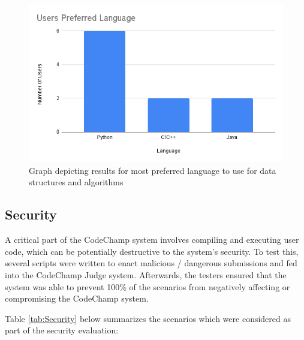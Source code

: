 \documentclass[12pt, titlepage]{article}
\begin{document}
\begin{itemize}
    \begin{figure}[H]
    \centering
    \includegraphics[width=1\textwidth]{question4chart.png}
    
    \caption{Graph depicting results for most preferred language to use for data structures and algorithms}
    
    \label{FigUH-4}
    \end{figure}
    
\end{itemize}

\subsection{Security}\label{sec:security}
A critical part of the CodeChamp system involves compiling and executing user code, which can be potentially destructive to the system's security. To test this, several scripts were written to enact malicious / dangerous submissions and fed into the CodeChamp Judge system. Afterwards, the testers ensured that the system was able to prevent 100\% of the scenarios from negatively affecting or compromising the CodeChamp system.

Table \ref{tab:Security} below summarizes the scenarios which were considered as part of the security evaluation:
\end{document}
